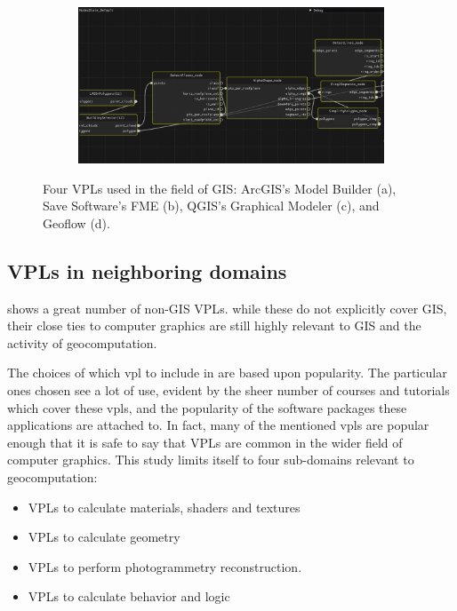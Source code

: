 \begin{figure}
\begin{subfigure}[c]{0.45\linewidth}
  \caption{}\label{fig:gisvpl:3}
\end{subfigure}%
\qquad 
\begin{subfigure}[d]{0.45\linewidth}
  \centering
  \graphicspath{{../../assets/images/background/geo-vpl/}}
  \includegraphics[width=\linewidth]{geoflow.png}
  \caption{}\label{fig:gisvpl:4}
\end{subfigure}%
\caption[GIS VPLs]{Four VPLs used in the field of GIS: 
ArcGIS's Model Builder \citep{esri_modelbuilder_2022} (a), 
Save Software's FME \citep{safe-software_fme_2022} (b), 
QGIS's Graphical Modeler \cite{qgis_community_qgis_2022} (c), 
and Geoflow \citep{peters_geoflow_2019} (d).}
\label{fig:gisvpl}
\end{figure}

\subsection*{ VPLs in neighboring domains }

 shows a great number of non-GIS \ac{VPL}s.
while these do not explicitly cover GIS, their close ties to computer graphics are still highly relevant to GIS and the activity of geocomputation.  

The choices of which vpl to include in  are based upon popularity.  
The particular ones chosen see a lot of use, evident by the sheer number of courses and tutorials which cover these vpls, and the popularity of the software packages these applications are attached to. 
In fact, many of the mentioned vpls are popular enough that it is safe to say that \ac{VPL}s are common in the wider field of computer graphics. 
This study limits itself to four sub-domains relevant to geocomputation:
\begin{itemize}[-]
  \item VPLs to calculate materials, shaders and textures
  \item VPLs to calculate geometry
  \item VPLs to perform photogrammetry reconstruction. 
  \item VPLs to calculate behavior and logic
\end{itemize}

